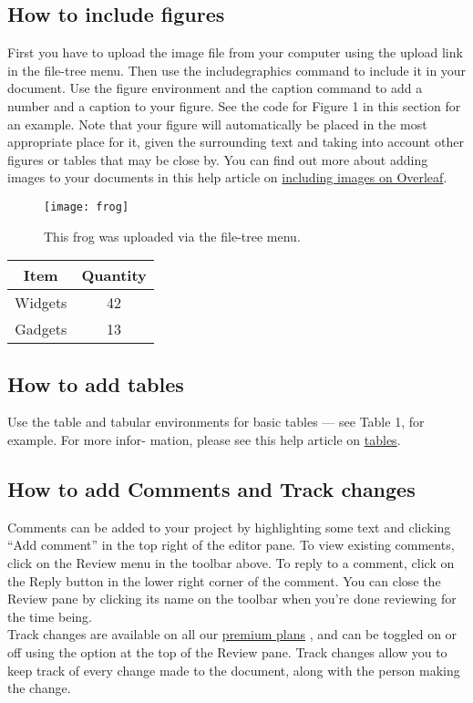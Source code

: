 \documentclass{article}
\begin{document}
	  \subsection{How to include figures}
	  First you have to upload the image file from your computer using the upload link in the file-tree menu.
	  Then use the includegraphics command to include it in your document. Use the figure environment
	  and the caption command to add a number and a caption to your figure. See the code for Figure 1 in
	  this section for an example.
	  Note that your figure will automatically be placed in the most appropriate place for it, given the
	  surrounding text and taking into account other figures or tables that may be close by. You can find
	  out more about adding images to your documents in this help article on \href{https://www.overleaf.com/learn/how-to/Including_images_on_Overleaf}{including images on Overleaf}. 
	 \begin{figure}[t]
	 	\centering
	  	\texttt{[image: frog]}
	  	\caption{This frog was uploaded via the file-tree menu.}
	  	\label{fig:example}
	 \end{figure}
     \begin{table}
     	\centering
     	\begin{tabular}{|c|c|}
     	   \hline
     	   Item & Quantity \\
     	   \hline
     	   Widgets & 42 \\
     	   Gadgets & 13\\ 
     	\end{tabular}
     \end{table}
   \subsection{How to add tables}
    Use the table and tabular environments for basic tables — see Table 1, for example. For more infor-
    mation, please see this help article on \href{https://www.overleaf.com/learn/latex/tables}{tables}.
    \subsection{How to add Comments and Track changes}
    Comments can be added to your project by highlighting some text and clicking “Add comment” in
    the top right of the editor pane. To view existing comments, click on the Review menu in the toolbar
    above. To reply to a comment, click on the Reply button in the lower right corner of the comment.
    You can close the Review pane by clicking its name on the toolbar when you’re done reviewing for the
    time being.\\
    Track changes are available on all our \href{https://www.overleaf.com/user/subscription/plans}{premium plans} , and can be toggled on or off using the option
    at the top of the Review pane. Track changes allow you to keep track of every change made to the
    document, along with the person making the change.
\end{document}
